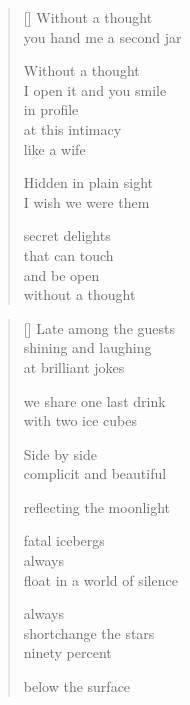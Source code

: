 \documentclass[12pt,a4paper]{article}
\begin{document}
\poemtitle{}

\settowidth{\versewidth}{You hand me a second jar}

\bigskip

\begin{verse}[\versewidth]
  Without a thought \\
  you hand me a second jar

  Without a thought \\
  I open it and you smile \\
  in profile \\
  at this intimacy \\
  like a wife

  Hidden in plain sight \\
  I wish we were them

  secret delights \\
  that can touch \\
  and be open \\
  without a thought
\end{verse}


\newpage

\poemtitle{}

\settowidth{\versewidth}{float on a world of silence}

\bigskip

\begin{verse}[\versewidth]
  Late among the guests \\
  shining and laughing \\
  at brilliant jokes

  we share one last drink \\
  with two ice cubes

  Side by side \\
  complicit and beautiful

  reflecting the moonlight

  fatal icebergs \\
  always \\
  float in a world of silence

  always \\
  shortchange the stars \\
  ninety percent

  below the surface
\end{verse}

\end{document}
